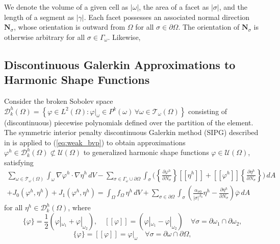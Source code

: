 	We denote the volume of a given cell as $|\omega|$, the area of a facet as $|\sigma|$, and the length of a segment as $|\gamma|$. Each facet possesses an associated normal direction $\mathbf{N}_\sigma$, whose orientation is outward from $\Omega$ for all $\sigma \in \partial \Omega$. The orientation of $\mathbf{N}_\sigma$ is otherwise arbitrary for all $\sigma \in \Gamma_\omega$. Likewise, 

\subsection*{Discontinuous Galerkin Approximations to \\ Harmonic Shape Functions}

	Consider the broken Sobolev space $\mathcal{D}^h_k (\Omega) = \left\{ \varphi \in L^2 (\Omega) : \varphi|_{\omega} \in P^k (\omega) \, \forall \omega \in \mathcal{T}_\omega (\Omega) \right\}$ consisting of (discontinuous) piecewise polynomials defined over the partition of the element. The symmetric interior penalty discontinuous Galerkin method (SIPG) described in \cite{Riviere:08} is applied to (\ref{eq:weak_bvp}) to obtain approximations $\varphi^h \in \mathcal{D}^h_k (\Omega) \not\subset \mathcal{U} (\Omega)$ to generalized harmonic shape functions $\varphi \in \mathcal{U} (\Omega)$, satisfying
	\begin{eqnarray}
		\sum_{\omega \in \mathcal{T}_\omega (\Omega)} \int_{\omega} \nabla \varphi^h \cdot \nabla \eta^h \, dV - \sum_{\sigma \in \Gamma_\omega \cup \partial \Omega} \int_{\sigma} \bigg( \left\{ \frac{\partial \varphi^h}{\partial N_{\sigma}} \right\} [\![ \eta^h ]\!] + [\![ \varphi^h ]\!] \left\{ \frac{\partial \eta^h}{\partial N_{\sigma}} \right\}  \bigg) \, dA \nonumber \\ + J_0 (\varphi^h,\eta^h) + J_1 (\varphi^h,\eta^h) = \int_{\Omega} f_{\Omega} \, \eta^h \, dV + \sum_{\sigma \in \partial \Omega} \int_{\sigma} \left(\frac{\alpha_{\sigma0}}{|\sigma|^{\beta_0}} \eta^h - \frac{\partial \eta^h}{\partial N_{\sigma}} \right) \bar{\varphi} \, dA
		\label{eq:dg_poisson}
	\end{eqnarray}
	for all $\eta^h \in \mathcal{D}^h_k (\Omega)$, where
	\begin{equation}
		\{ \varphi \} = \frac{1}{2} (\varphi|_{\omega_1} + \varphi|_{\omega_2}), \quad [\![ \varphi ]\!] = (\varphi|_{\omega_1} - \varphi|_{\omega_2}) \quad \forall \sigma = \partial \omega_1 \cap \partial \omega_2,
	\end{equation}
	\begin{equation}
		\{ \varphi \} = [\![ \varphi ]\!] = \varphi|_{\omega} \quad \forall \sigma = \partial \omega \cap \partial \Omega,
	\end{equation}

